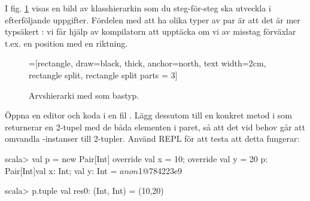 I fig. \ref{snake:fig:pairs-uml} visas en bild av klasshierarkin som du steg-för-steg ska utveckla i efterföljande  uppgifter. Fördelen med att ha olika typer av par är att det är mer typsäkert : vi får hjälp av kompilatorn att upptäcka om vi av misstag förväxlar t.ex. en position med en riktning.

\begin{figure}[H]
\begin{center}
\newcommand{\TextBox}[1]{\raisebox{0pt}[1em][0.5em]{#1}}
=[rectangle, draw=black,  thick, anchor=north, text width=2cm, rectangle split, rectangle split parts = 3]
\end{center}
\caption{Arvshierarki med  som bastyp.}
\label{snake:fig:pairs-uml}
\end{figure}

\Subtask Öppna en editor och koda  i en fil . Lägg dessutom till en konkret metod  i  som returnerar en 2-tupel med de båda elementen i paret, så att det vid behov går att omvandla -instanser till 2-tupler. Använd REPL för att testa att detta fungerar:
\begin{REPLnonum}
scala> val p = new Pair[Int] { override val x = 10; override val y = 20 }
p: Pair[Int]{val x: Int; val y: Int} = $anon$1@784223e9

scala> p.tuple
val res0: (Int, Int) = (10,20)
\end{REPLnonum}

